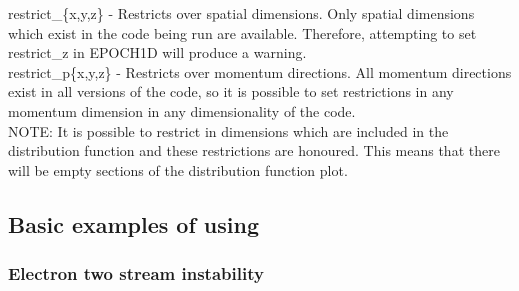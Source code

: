 {\emphtext restrict\_\{x,y,z\}} - Restricts over spatial dimensions. Only
spatial dimensions which exist in the code being run are available. Therefore,
attempting to set restrict\_z in EPOCH1D will produce a warning.\\

{\emphtext restrict\_p\{x,y,z\}} - Restricts over momentum directions. All
momentum directions exist in all versions of the code, so it is possible to set
restrictions in any momentum dimension in any dimensionality of the code.\\

{\emphtext NOTE: It is possible to restrict in dimensions which are included in
the distribution function and these restrictions are honoured. This means that
there will be empty sections of the distribution function plot.}

\subsection{Basic examples of using {\EPOCH}}

\subsubsection{Electron two stream instability}

